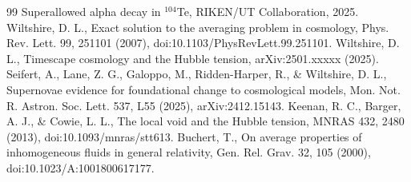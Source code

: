 \documentclass[11pt,a4paper]{article}
\begin{document}
\begin{thebibliography}{99}
 Superallowed alpha decay in \(^{104}\)Te, RIKEN/UT Collaboration, 2025.
 Wiltshire, D. L., Exact solution to the averaging problem in cosmology, Phys. Rev. Lett. 99, 251101 (2007), doi:10.1103/PhysRevLett.99.251101.
 Wiltshire, D. L., Timescape cosmology and the Hubble tension, arXiv:2501.xxxxx (2025).
 Seifert, A., Lane, Z. G., Galoppo, M., Ridden-Harper, R., \& Wiltshire, D. L., Supernovae evidence for foundational change to cosmological models, Mon. Not. R. Astron. Soc. Lett. 537, L55 (2025), arXiv:2412.15143.
 Keenan, R. C., Barger, A. J., \& Cowie, L. L., The local void and the Hubble tension, MNRAS 432, 2480 (2013), doi:10.1093/mnras/stt613.
 Buchert, T., On average properties of inhomogeneous fluids in general relativity, Gen. Rel. Grav. 32, 105 (2000), doi:10.1023/A:1001800617177.
\end{thebibliography}
\end{document}

